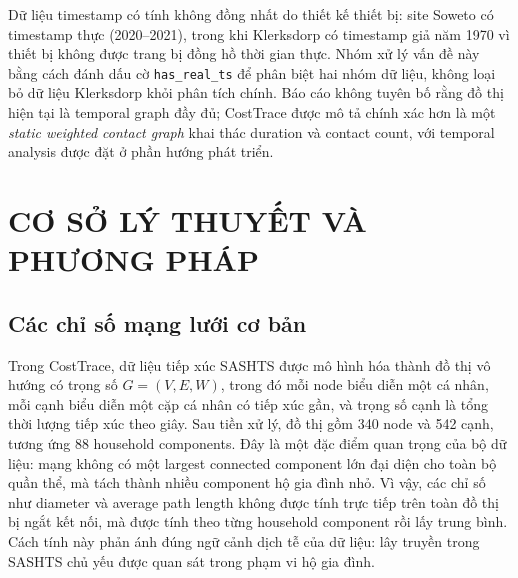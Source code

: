 \documentclass[12pt,a4paper]{report}
\theoremstyle{definition}
\begin{document}
Dữ liệu timestamp có tính không đồng nhất do thiết kế thiết bị: site Soweto có timestamp thực (2020--2021), trong khi Klerksdorp có timestamp giả năm 1970 vì thiết bị không được trang bị đồng hồ thời gian thực. Nhóm xử lý vấn đề này bằng cách đánh dấu cờ \texttt{has\_real\_ts} để phân biệt hai nhóm dữ liệu, không loại bỏ dữ liệu Klerksdorp khỏi phân tích chính. Báo cáo không tuyên bố rằng đồ thị hiện tại là temporal graph đầy đủ; CostTrace được mô tả chính xác hơn là một \textit{static weighted contact graph} khai thác duration và contact count, với temporal analysis được đặt ở phần hướng phát triển.

\chapter{CƠ SỞ LÝ THUYẾT VÀ PHƯƠNG PHÁP}

\section{Các chỉ số mạng lưới cơ bản}
\label{sec:basic_network_metrics}

Trong CostTrace, dữ liệu tiếp xúc SASHTS được mô hình hóa thành đồ thị vô hướng có trọng số $G=(V,E,W)$, trong đó mỗi node biểu diễn một cá nhân, mỗi cạnh biểu diễn một cặp cá nhân có tiếp xúc gần, và trọng số cạnh là tổng thời lượng tiếp xúc theo giây. Sau tiền xử lý, đồ thị gồm 340 node và 542 cạnh, tương ứng 88 household components. Đây là một đặc điểm quan trọng của bộ dữ liệu: mạng không có một largest connected component lớn đại diện cho toàn bộ quần thể, mà tách thành nhiều component hộ gia đình nhỏ. Vì vậy, các chỉ số như diameter và average path length không được tính trực tiếp trên toàn đồ thị bị ngắt kết nối, mà được tính theo từng household component rồi lấy trung bình. Cách tính này phản ánh đúng ngữ cảnh dịch tễ của dữ liệu: lây truyền trong SASHTS chủ yếu được quan sát trong phạm vi hộ gia đình.
\end{document}
